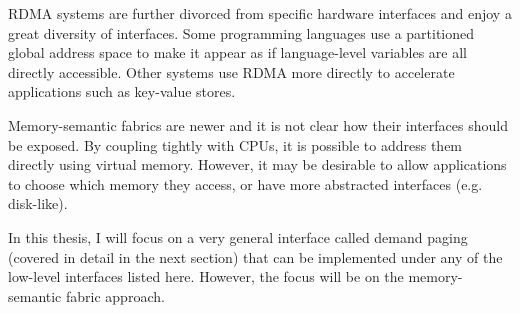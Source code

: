 RDMA systems are further divorced from specific hardware interfaces and enjoy
a great diversity of interfaces. Some programming languages use a partitioned global
address space to make it appear as if language-level variables are all directly
accessible\cite{upc}\cite{grappa}. Other systems use RDMA more directly to
accelerate applications such as key-value stores\cite{ramcloud}\cite{farm}.

Memory-semantic fabrics are newer and it is not clear how their interfaces
should be exposed. By coupling tightly with CPUs, it is possible to address
them directly using virtual memory. However, it may be desirable to allow
applications to choose which memory they access, or have more abstracted
interfaces (e.g. disk-like).

In this thesis, I will focus on a very general interface called demand paging
(covered in detail in the next section) that can be implemented under any of
the low-level interfaces listed here. However, the focus will be on the
memory-semantic fabric approach.


